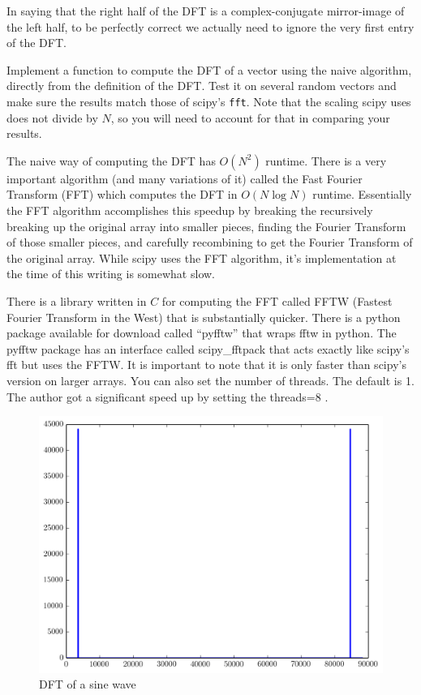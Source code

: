 In saying that the right half of the DFT is a complex-conjugate mirror-image of the left half, to be perfectly correct we actually need to ignore the very first entry of the DFT.


\begin{problem}
Implement a function to compute the DFT of a vector using the naive algorithm, directly from the definition of the DFT. Test it on several random vectors and make sure the results match those of scipy's \texttt{fft}.  Note that the scaling scipy uses does not divide by $N$, so you will need to account for that in comparing your results.
\end{problem}

The naive way of computing the DFT has $O(N^2)$ runtime.  There is a very important algorithm (and many variations of it) called the Fast Fourier Transform (FFT) which computes the DFT in $O(N \log N)$ runtime.  Essentially the FFT algorithm accomplishes this speedup by breaking the recursively breaking up the original array into smaller pieces, finding the Fourier Transform of those smaller pieces, and carefully recombining to get the Fourier Transform of the original array.  While scipy uses the FFT algorithm, it's implementation at the time of this writing is somewhat slow.

There is a library written in $C$ for computing the FFT called FFTW (Fastest Fourier Transform in the West) that is substantially quicker.  There is a python package available for download called ``pyfftw'' that wraps fftw in python. The pyfftw package has an interface called scipy\_fftpack that acts exactly like scipy's fft but uses the FFTW. It is important to note that it is only faster than scipy's version on larger arrays. You can also set the number of threads. The default is 1. The author got a significant speed up by setting the threads=8 .

\begin{figure}[ht]\caption{DFT of a sine wave}\label{sinespec}\centering\includegraphics[width=\textwidth]{sinespec}\end{figure}

